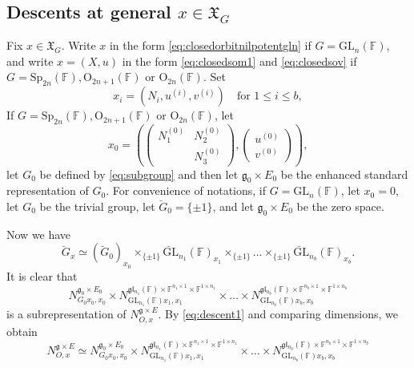 \documentclass[12pt]{amsart}
\theoremstyle{definition}
\theoremstyle{remark}\newtheorem{rmk}[lm]{Remark}
\newcommand{\RO}{{\mathrm {O}}}
\newcommand{\GL}{{\mathrm{GL}}}
\newcommand{\Sp}{{\mathrm{Sp}}}
\newcommand{\g}{\mathfrak g}
\newcommand{\gl}{\mathfrak g \mathfrak l}
\newcommand{\fX}{\mathfrak X}
\newcommand{\C}{\mathbb{F}}
\begin{document}
    \subsection{Descents at general $x\in\fX_{G}$}
    Fix $x\in\fX_{G}$. Write $x$ in the form \eqref{eq:closedorbitnilpotentgln} if $G=\GL_n(\C)$, and write $x=(X,u)$ in the form \eqref{eq:closedsom1} and \eqref{eq:closedsov} if $G=\Sp_{2n}(\C),\RO_{2n+1}(\C)$ or $\RO_{2n}(\C)$. Set
	\begin{equation*}
		x_i=(N_i,u^{(i)},v^{(i)})\quad\text{for }1\leq i\leq b,
	\end{equation*}
	If $G=\Sp_{2n}(\C),\RO_{2n+1}(\C)$ or $\RO_{2n}(\C)$, let
	\begin{equation*}
		x_0=\left(\left(\begin{matrix}
			N_1^{(0)}&N_2^{(0)}\\&N_3^{(0)}
		\end{matrix}\right),\left(\begin{matrix}
			u^{(0)}\\v^{(0)}
		\end{matrix}\right)\right),
	\end{equation*}
	let $G_0$ be defined by \eqref{eq:subgroup} and then let $\g_0\times E_0$ be the enhanced standard representation of $G_0$. For convenience of notations, if $G=\GL_n(\C)$, let $x_0=0$, let $G_0$ be the trivial group, let $\breve G_0=\{\pm 1\}$, and let $\g_0\times E_0$ be the zero space.
	
	Now we have
	\begin{equation*}
		\breve{G}_x\simeq\left(\breve{G}_0\right)_{x_0}\times_{\{\pm 1\}}\breve{\GL}_{n_1}(\C)_{x_1}\times_{\{\pm 1\}}\dots\times_{\{\pm 1\}}\breve{\GL}_{n_b}(\C)_{x_b}.
	\end{equation*}
	It is clear that
	\begin{equation*}
		N_{G_0x_0,x_0}^{\g_0\times E_0}\times N_{\GL_{n_1}(\C)x_1,x_1}^{\gl_{n_1}(\C)\times\C^{n_1\times 1}\times\C^{1\times n_1}}\times\dots\times N_{\GL_{n_b}(\C)x_b,x_b}^{\gl_{n_b}(\C)\times\C^{n_b\times 1}\times\C^{1\times n_b}}
	\end{equation*}
	is a subrepresentation of $N_{O,x}^{\g\times E}$. By \eqref{eq:descent1} and comparing dimensions, we obtain
	\begin{equation}
		\label{eq:descent2}
		N_{O,x}^{\g\times E}\simeq N_{G_0x_0,x_0}^{\g_0\times E_0}\times N_{\GL_{n_1}(\C)x_1,x_1}^{\gl_{n_1}(\C)\times\C^{n_1\times 1}\times\C^{1\times n_1}}\times\dots\times N_{\GL_{n_b}(\C)x_b,x_b}^{\gl_{n_b}(\C)\times\C^{n_b\times 1}\times\C^{1\times n_b}}
	\end{equation}
	
\end{document}
